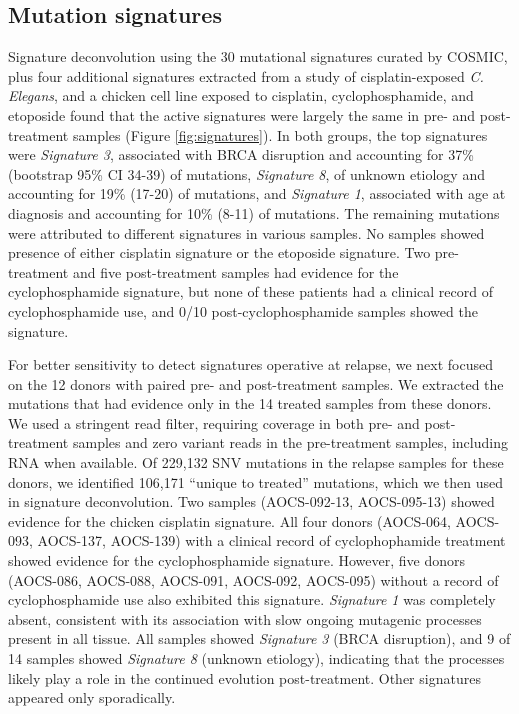 
\subsection*{Mutation signatures}
Signature deconvolution using the 30 mutational signatures curated by COSMIC\cite{364242}, plus four additional signatures extracted from a study of cisplatin-exposed \textit{C. Elegans}\cite{Meier_2014}, and a chicken cell line exposed to cisplatin, cyclophosphamide, and etoposide\cite{Szikriszt_2016} found that the active signatures were largely the same in pre- and post-treatment samples (Figure \ref{fig:signatures}). In both groups, the top signatures were \textit{Signature 3}, associated with BRCA disruption and accounting for 37\% (bootstrap 95\% CI 34-39) of mutations, \textit{Signature 8}, of unknown etiology and accounting for 19\% (17-20) of mutations, and \textit{Signature 1}, associated with age at diagnosis and accounting for 10\% (8-11) of mutations. The remaining mutations were attributed to different signatures in various samples. No samples showed presence of either cisplatin signature or the etoposide signature. Two pre-treatment and five post-treatment samples had evidence for the cyclophosphamide signature, but none of these patients had a clinical record of cyclophosphamide use, and 0/10 post-cyclophosphamide samples showed the signature.

For better sensitivity to detect signatures operative at relapse, we next focused on the 12 donors with paired pre- and post-treatment samples. We extracted the mutations that had evidence only in the 14 treated samples from these donors. We used a stringent read filter, requiring coverage in both pre- and post-treatment samples and zero variant reads in the pre-treatment samples, including RNA when available. Of 229,132 SNV mutations in the relapse samples for these donors, we identified 106,171 ``unique to treated'' mutations, which we then used in signature deconvolution. Two samples (AOCS-092-13, AOCS-095-13) showed evidence for the chicken cisplatin signature. All four donors (AOCS-064, AOCS-093, AOCS-137, AOCS-139) with a clinical record of cyclophophamide treatment showed evidence for the cyclophosphamide signature. However, five donors (AOCS-086, AOCS-088, AOCS-091, AOCS-092, AOCS-095) without a  record of cyclophosphamide use also exhibited this signature. \textit{Signature 1} was completely absent, consistent with its association with slow ongoing mutagenic processes present in all tissue. All samples showed \textit{Signature 3} (BRCA disruption), and 9 of 14 samples showed \textit{Signature 8} (unknown etiology), indicating that the processes likely play a role in the continued evolution post-treatment. Other signatures appeared only sporadically.

